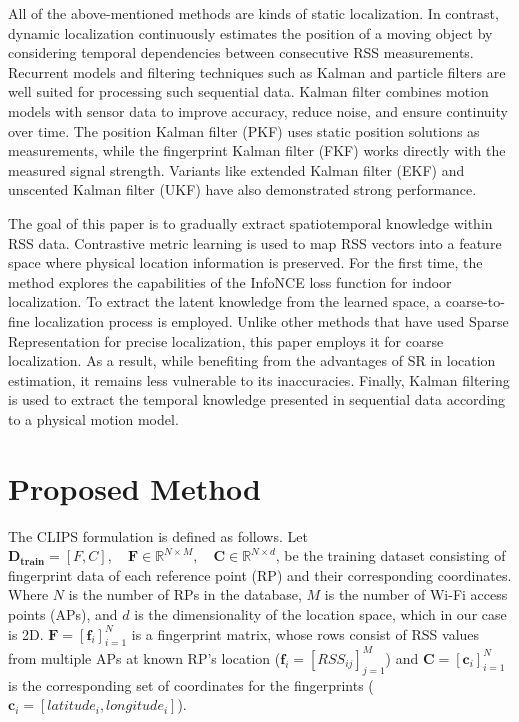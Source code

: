 \documentclass[journal,twoside,web]{ieeecolor}
\begin{document}
All of the above-mentioned methods are kinds of static localization. 
In contrast, dynamic localization continuously estimates the position of a moving object by considering temporal dependencies between consecutive RSS measurements.
Recurrent models \cite{RNN2, LSTM1} and filtering techniques such as Kalman and particle filters \cite{PKF, FKF, EKF2, UKF2} are well suited for processing such sequential data. Kalman filter combines motion models with sensor data to improve accuracy, reduce noise, and ensure continuity over time. The position Kalman filter (PKF) \cite{PKF} uses static position solutions as measurements, while the fingerprint Kalman filter (FKF) \cite{FKF} works directly with the measured signal strength. Variants like extended Kalman filter (EKF) \cite{EKF2} and unscented
Kalman filter (UKF) \cite{UKF2} have also demonstrated strong performance.

The goal of this paper is to gradually extract spatiotemporal knowledge within RSS data.
Contrastive metric learning is used to map RSS vectors into a feature space where physical location information is preserved. For the first time, the method explores the capabilities of the InfoNCE loss function for indoor localization.
To extract the latent knowledge from the learned space, a coarse-to-fine localization process is employed. Unlike other methods that have used Sparse Representation for precise localization, this paper employs it for coarse localization. As a result, while benefiting from the advantages of SR in location estimation, it remains less vulnerable to its inaccuracies. Finally, Kalman filtering is used to extract the temporal knowledge presented in sequential data according to a physical motion model.
\section{Proposed Method}
The CLIPS formulation is defined as follows.
 Let \(\mathbf{D_{train}} = [ F,C], \quad \mathbf F \in \mathbb{R}^{N\times M}, \quad \mathbf C \in \mathbb{R}^{N\times d}\), be the training dataset consisting of fingerprint data of each reference point (RP) and their corresponding coordinates.     
 Where $N$ is the number of RPs in the database, $M$ is the number of Wi-Fi access points (APs), and $d$ is the dimensionality of the location space, which in our case is 2D.
$\mathbf{F}=[\mathbf{f}_i]_{i=1}^N$ is a fingerprint matrix, whose rows consist of RSS values from multiple APs at known RP's location (\(    \mathbf{f}_{i} = [RSS_{ij}]_{j=1}^M\)) and $\mathbf{C}=[\mathbf{c}_i]_{i=1}^N$ is the corresponding set of coordinates for the fingerprints
(\(\mathbf{c}_{i} = [latitude_i,longitude_i] \)).
\end{document}
